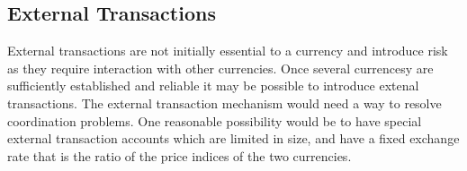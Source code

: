 \subsection{External Transactions}

External transactions are not initially essential to a currency and introduce risk as they require
interaction with other currencies. Once several currencesy are sufficiently established and
reliable it may be possible to introduce extenal transactions. The external transaction mechanism
would need a way to resolve coordination problems. One reasonable possibility would be to have
special external transaction accounts which are limited in size, and have a fixed exchange rate that
is the ratio of the price indices of the two currencies. 


% 
% 
% 
% 
% 
% 
% 
% 
% 
% 
